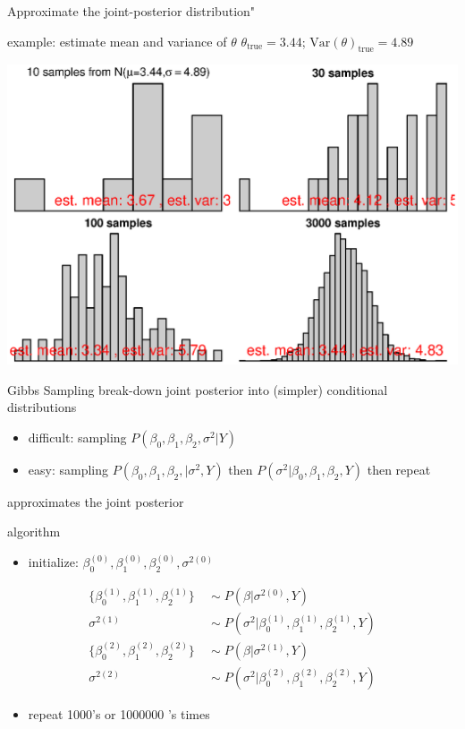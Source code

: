 \documentclass[presentation,9pt,xcolor=dvipsnames]{beamer}
\begin{document}
\begin{frame}[label={sec:orgfb20450}]{Approximate the joint-posterior distribution"}
\begin{block}{example: estimate mean and variance of \(\theta\)}
\(\theta_{\text{true}}=3.44\); \(\text{Var}(\theta)_{\text{true}}=4.89\)
\begin{center}
\includegraphics[width=.9\linewidth]{sample_approximations.eps}
\end{center}
\end{block}
\end{frame}
\begin{frame}[label={sec:org0c08d30}]{Gibbs Sampling}
break-down joint posterior into (simpler) conditional distributions
\begin{itemize}
\item difficult: sampling \(P(\beta_0,\beta_1,\beta_2,\sigma^2\vert Y)\)
\item easy: sampling \(P(\beta_0,\beta_1,\beta_2,\vert\sigma^2, Y)\) then \(P(\sigma^2\vert\beta_0,\beta_1,\beta_2,Y)\) then repeat
\end{itemize}
approximates the joint posterior
\begin{block}{algorithm}
\begin{itemize}
\item initialize: \(\beta_0^{(0)},\beta_1^{(0)},\beta_2^{(0)},\sigma^{2(0)}\)
\end{itemize}
\begin{equation}
\begin{aligned}
\{\beta_0^{(1)},\beta_1^{(1)},\beta_2^{(1)}\} &\ \sim P(\beta \vert \sigma^{2(0)},Y) \\
\sigma^{2(1)} &\ \sim P(\sigma^2 \vert \beta_0^{(1)},\beta_1^{(1)},\beta_2^{(1)},Y) \\
\{\beta_0^{(2)},\beta_1^{(2)},\beta_2^{(2)}\} &\ \sim P(\beta \vert \sigma^{2(1)},Y) \\
\sigma^{2(2)} &\ \sim P(\sigma^2 \vert \beta_0^{(2)},\beta_1^{(2)},\beta_2^{(2)},Y)
\end{aligned}
\end{equation}
\begin{itemize}
\item repeat 1000's or 1000000 's times
\end{itemize}
\end{block}
\end{frame}
\end{document}
